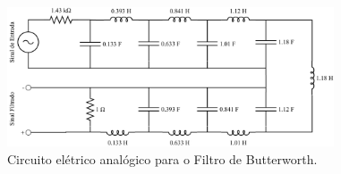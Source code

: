 \documentclass[a4paper,11pt]{article}
\numberwithin{figure}{section}
\numberwithin{equation}{section}
\numberwithin{table}{section}
\theoremstyle{definition}
\begin{document}
\begin{figure}[ht] \centering
	\includegraphics[width=0.86\textwidth]{butterworth}
	\caption{Circuito elétrico analógico para o Filtro de Butterworth.}
	\label{fig:butterworth}
\end{figure}

\end{document}
